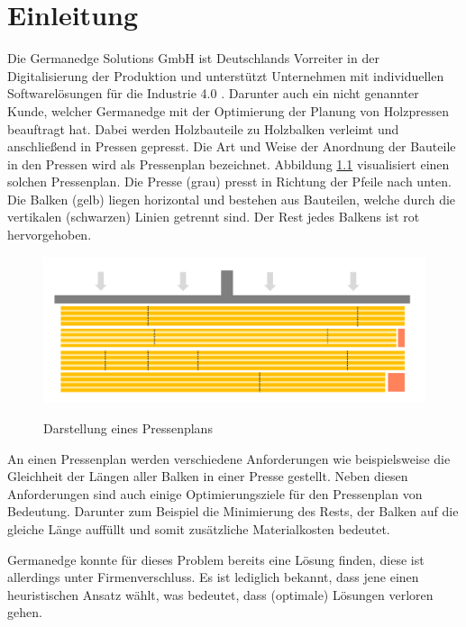 \chapter{Einleitung}
\label{chapter:Einleitung}

Die Germanedge Solutions GmbH ist Deutschlands Vorreiter in der Digitalisierung der Produktion und
unterstützt Unternehmen mit individuellen Softwarelösungen für die Industrie 4.0 \cite{industry4dot0}.
Darunter auch ein nicht genannter Kunde, welcher Germanedge mit der Optimierung der Planung von Holzpressen beauftragt hat.
Dabei werden Holzbauteile zu Holzbalken verleimt und anschließend in Pressen gepresst.
Die Art und Weise der Anordnung der Bauteile in den Pressen wird als Pressenplan bezeichnet.
Abbildung \ref{figure:pressenplan} visualisiert einen solchen Pressenplan.
Die Presse (grau) presst in Richtung der Pfeile nach unten.
Die Balken (gelb) liegen horizontal und bestehen aus Bauteilen, welche durch die vertikalen (schwarzen) Linien getrennt sind.
Der Rest jedes Balkens ist rot hervorgehoben.

\begin{figure}[h]
    \centering
    \includegraphics[width=1.00\textwidth, center]{Images/Pressenplan}\\
    \caption{Darstellung eines Pressenplans}
    \label{figure:pressenplan}
\end{figure}

An einen Pressenplan werden verschiedene Anforderungen wie beispielsweise die Gleichheit der Längen aller Balken in einer Presse gestellt.
Neben diesen Anforderungen sind auch einige Optimierungsziele für den Pressenplan von Bedeutung.
Darunter zum Beispiel die Minimierung des Rests, der Balken auf die gleiche Länge auffüllt und somit zusätzliche Materialkosten bedeutet.

Germanedge konnte für dieses Problem bereits eine Lösung finden, diese ist allerdings unter Firmenverschluss.
Es ist lediglich bekannt, dass jene einen heuristischen Ansatz wählt, was bedeutet, dass (optimale) Lösungen verloren gehen.

